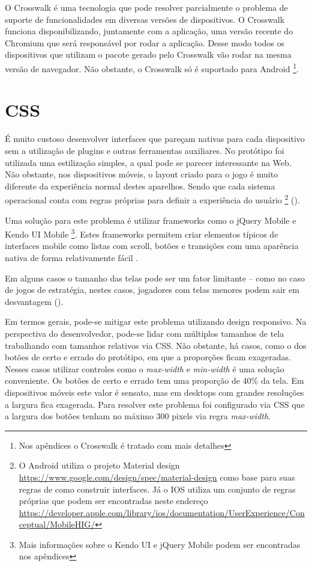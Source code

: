 O Crosswalk é uma tecnologia que pode resolver parcialmente o problema
de suporte de funcionalidades em diversas versões de dispositivos.
O Crosswalk funciona disponibilizando, juntamente com a aplicação,
uma versão recente do Chromium que será responsável por rodar a
aplicação. Desse modo todos os dispositivos que utilizam o pacote
gerado pelo Crosswalk vão rodar na mesma versão de navegador. Não
obstante, o Crosswalk só é suportado para Android \footnote{Nos
apêndices o Crosswalk é tratado com mais detalhes}.

\section{CSS}

É muito custoso desenvolver interfaces que pareçam nativas para
cada dispositivo sem a utilização de plugins e outras ferramentas auxiliares. No
protótipo foi utilizada uma estilização simples, a qual pode se
parecer interessante na Web. Não obstante, nos dispositivos móveis,
o layout criado para o jogo é muito diferente da experiência normal
destes aparelhos. Sendo que cada sistema operacional conta com regras
próprias para definir a experiência do usuário \footnote{
    O Android utiliza o projeto Material design \url{https://www.google.com/design/spec/material-design} como base para suas 
    regras de como construir interfaces.  Já o IOS utiliza um conjunto 
    de regras próprias que podem ser encontradas neste endereço \url{https://developer.apple.com/library/ios/documentation/UserExperience/Conceptual/MobileHIG/}
} ().

Uma solução para este problema é utilizar frameworks como o jQuery
Mobile e Kendo UI Mobile \footnote{Mais informações sobre o Kendo UI
e jQuery Mobile podem ser encontradas nos apêndices}. Estes frameworks
permitem criar elementos típicos de interfaces mobile como listas
com scroll, botões e transições com uma aparência nativa de forma
relativamente fácil \autocite{publishHtml5}.

Em alguns casos o tamanho das telas pode ser um fator
limitante – como no caso de jogos de estratégia, nestes
casos, jogadores com telas menores podem sair em desvantagem
().

Em termos gerais, pode-se mitigar este problema utilizando design
responsivo. Na perspectiva do desenvolvedor, pode-se lidar com
múltiplos tamanhos de tela trabalhando com tamanhos relativos via
CSS. Não obstante, há casos, como o dos botões de certo e errado
do protótipo, em que a proporções ficam exageradas. Nesses casos
utilizar controles como o \textit{max-width} e \textit{min-width} é uma
solução conveniente. Os botões de certo e errado tem uma proporção
de 40\% da tela. Em dispositivos móveis este valor é sensato, mas
em desktops com grandes resoluções a largura fica exagerada. Para
resolver este problema foi configurado via CSS que a largura dos botões
tenham no máximo 300 pixels via regra \textit{max-width}.

